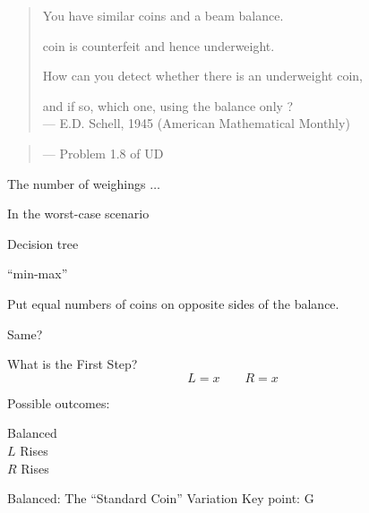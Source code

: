 
\begin{frame}{}
  \begin{quote}
    You have  similar coins and a beam balance.

     coin is counterfeit and hence underweight.

    How can you detect whether there is an underweight coin, 

    and if so, which one, using the balance only ? \\[8pt]

    \hfill --- E.D. Schell, 1945 (American Mathematical Monthly)
  \end{quote}
\end{frame}

\begin{frame}{}
  \begin{quote}

    \hfill --- Problem 1.8 of UD
  \end{quote}
\end{frame}

\begin{frame}{}
  The  number of weighings $\dots$

  In the worst-case scenario

  Decision tree

  ``min-max''
\end{frame}

\begin{frame}{}
  \centerline{Put equal numbers of coins on opposite sides of the balance.}

  Same?
\end{frame}

\begin{frame}{What is the First Step?}
  \[
    L = x \qquad R = x
  \]

  Possible outcomes:
  \begin{description}
    \item[Balanced]
    \item[$L$ Rises]
    \item[$R$ Rises]
  \end{description}
\end{frame}

\begin{frame}{Balanced: The ``Standard Coin'' Variation}
  Key point: G

\end{frame}


